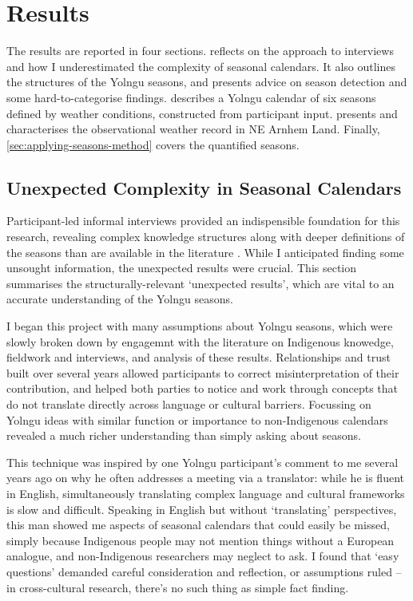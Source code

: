 \chapter{Results}
\label{ch:results}

The results are reported in four sections.  
reflects on the approach to interviews and how I underestimated the complexity
of seasonal calendars.  It also outlines the structures of the Yolngu seasons,
and presents advice on season detection and some hard-to-categorise findings.
 describes a Yolngu calendar of six seasons
defined by weather conditions, constructed from participant input.
 presents and characterises the observational weather
record in NE Arnhem Land.  Finally, \cref{sec:applying-seasons-method} covers
the quantified seasons.



\section{Unexpected Complexity in Seasonal Calendars}
\label{sec:complex-seasons}

Participant-led informal interviews provided an indispensible foundation
for this research, revealing complex knowledge structures along with deeper
definitions of the seasons than are available in the literature
\citep[eg.][]{davis1989,atlas2014}.  While I anticipated finding
some unsought information, the unexpected results were crucial.
This section summarises the structurally-relevant `unexpected results',
which are vital to an accurate understanding of the Yolngu seasons.

I began this project with many assumptions about Yolngu seasons, which were
slowly broken down by engagemnt with the literature on Indigenous knowedge,
fieldwork and interviews, and analysis of these results.  Relationships
and trust built over several years allowed participants to correct
misinterpretation of their contribution, and helped both parties to notice
and work through concepts that do not translate directly across language or
cultural barriers.  Focussing on Yolngu ideas with similar function or
importance to non-Indigenous calendars revealed a much richer understanding than
simply asking about seasons.

This technique was inspired by one Yolngu participant's
comment to me several years ago on why he often addresses a meeting via a
translator: while he is fluent in English, simultaneously translating complex
language and cultural frameworks is slow and difficult.
%
Speaking in English but without `translating' perspectives, this man showed me aspects of
seasonal calendars that could easily be missed, simply because Indigenous
people may not mention things without a European analogue, and non-Indigenous
researchers may neglect to ask.  I found that `easy questions' demanded careful
consideration and reflection, or assumptions ruled -- in cross-cultural
research, there's no such thing as simple fact finding.


